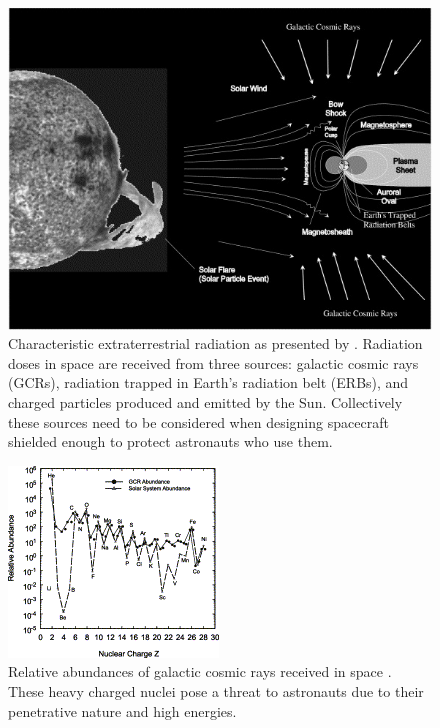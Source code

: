 \begin{figure}
\centering
\includegraphics[scale=0.5]{space-radiation.png}
\caption{Characteristic extraterrestrial radiation as presented by \cite{bentonbenton}. Radiation doses in space are received from three sources: galactic cosmic rays (GCRs), radiation trapped in Earth’s radiation belt (ERBs), and charged particles produced and emitted by the Sun. Collectively these sources need to be considered when designing spacecraft shielded enough to protect astronauts who use them.}
\label{fig:space-radiation }
\end{figure}

\begin{figure}
\centering
\includegraphics[scale=0.5]{abundances.png}
\caption{Relative abundances of galactic cosmic rays received in space \cite{bentonbenton}. These heavy charged nuclei pose a threat to astronauts due to their penetrative nature and high energies.}
\label{fig:abundances }
\end{figure}


